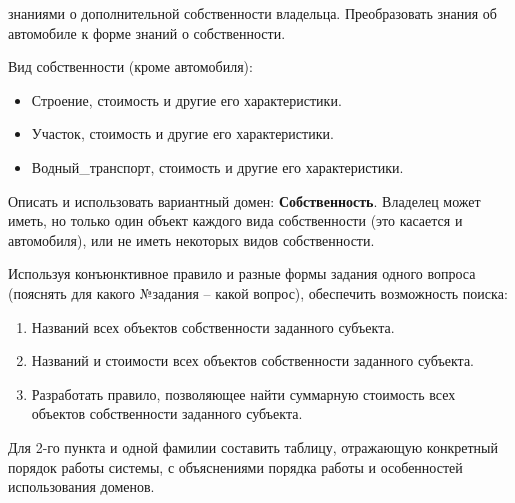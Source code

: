 \documentclass[12pt]{report}
\begin{document}
знаниями о дополнительной собственности владельца. Преобразовать знания об автомобиле к форме знаний о собственности.

Вид собственности (кроме автомобиля):

\begin{itemize}
	\item Строение, стоимость и другие его характеристики.
	\item Участок, стоимость и другие его характеристики.
	\item Водный\_транспорт, стоимость и другие его характеристики.
\end{itemize}

Описать и использовать вариантный домен: \textbf{Собственность}. Владелец может иметь, но только один объект каждого вида собственности (это касается и автомобиля), или не иметь некоторых видов собственности. 

Используя конъюнктивное правило и разные формы задания одного вопроса (пояснять для какого №задания – какой вопрос), обеспечить возможность поиска:

\begin{enumerate}
	\item Названий всех объектов собственности заданного субъекта.
	\item Названий и стоимости всех объектов собственности заданного субъекта.
	\item Разработать правило, позволяющее найти суммарную стоимость всех объектов собственности заданного субъекта.
\end{enumerate}

Для 2-го пункта и одной фамилии составить таблицу, отражающую конкретный порядок работы системы, с объяснениями порядка работы и особенностей использования доменов.
\end{document}
